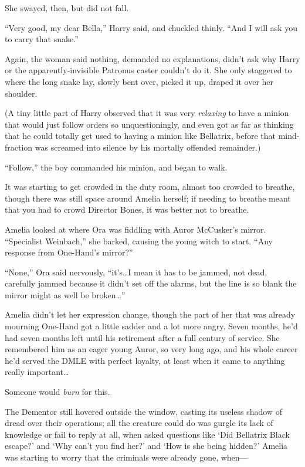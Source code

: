 She swayed, then, but did not fall.

“Very good, my dear Bella,” Harry said, and chuckled thinly. “And I will ask you to carry that snake.”

Again, the woman said nothing, demanded no explanations, didn’t ask why Harry or the apparently-invisible Patronus caster couldn’t do it. She only staggered to where the long snake lay, slowly bent over, picked it up, draped it over her shoulder.

(A tiny little part of Harry observed that it was very \emph{relaxing} to have a minion that would just follow orders so unquestioningly, and even got as far as thinking that he could totally get used to having a minion like Bellatrix, before that mind-fraction was screamed into silence by his mortally offended remainder.)

“Follow,” the boy commanded his minion, and began to walk.

\later

It was starting to get crowded in the duty room, almost too crowded to breathe, though there was still space around Amelia herself; if needing to breathe meant that you had to crowd Director Bones, it was better not to breathe.

Amelia looked at where Ora was fiddling with Auror McCusker’s mirror. “Specialist Weinbach,” she barked, causing the young witch to start. “Any response from One-Hand’s mirror?”

“None,” Ora said nervously, “it’s…I mean it has to be jammed, not dead, carefully jammed because it didn’t set off the alarms, but the line is so blank the mirror might as well be broken…”

Amelia didn’t let her expression change, though the part of her that was already mourning One-Hand got a little sadder and a lot more angry. Seven months, he’d had seven months left until his retirement after a full century of service. She remembered him as an eager young Auror, so very long ago, and his whole career he’d served the DMLE with perfect loyalty, at least when it came to anything really important…

Someone would \emph{burn} for this.

The Dementor still hovered outside the window, casting its useless shadow of dread over their operations; all the creature could do was gurgle its lack of knowledge or fail to reply at all, when asked questions like ‘Did Bellatrix Black escape?’ and ‘Why can’t you find her?’ and ‘How is she being hidden?’ Amelia was starting to worry that the criminals were already gone, when—

